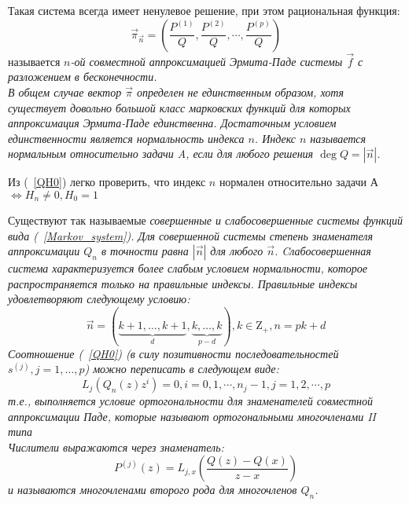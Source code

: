 Такая система всегда имеет ненулевое решение, при
этом рациональная функция:\\
\begin{equation}
\label{HermitePade} \overrightarrow{\pi}_{\overrightarrow{n}}=
\left( \frac {P^{(1)}} {Q}, \frac {P^{(2)}} {Q}, \cdots, \frac
{P^{(p)}} {Q} \right)
\end{equation}
называется \it $n$-ой совместной аппроксимацией Эрмита-Паде \rm
системы $\overrightarrow{f}$ с разложением в бесконечности. \\ В
общем случае вектор $\overrightarrow{\pi}$ определен не
единственным образом, хотя существует довольно большой класс
марковских функций для которых аппроксимация Эрмита-Паде
единственна. Достаточным условием единственности является \it
нормальность индекса \rm $n$. Индекс $n$ называется нормальным
относительно задачи A, если для любого решения $\deg Q=|\overrightarrow{n}|$. \\
\begin{coly} Из (~\ref{QH0}) легко проверить, что индекс $n$
нормален относительно задачи А $\Leftrightarrow H_n \not= 0, H_0
= 1$ \end{coly}
Существуют так называемые \it совершенные \rm и \it
слабосовершенные \rm системы функций вида (~\ref{Markov_system}).
Для совершенной системы степень знаменателя аппроксимации $Q_n$ в
точности равна $|\overrightarrow{n}|$ для любого
$\overrightarrow{n}$. Cлабосовершенная система характеризуется
более слабым условием нормальности, которое распространяется
только на правильные индексы. \it Правильные индексы \rm
удовлетворяют следующему условию:
$$
\overrightarrow{n}=(\underbrace{k+1,\ldots,k+1}_{d},\underbrace{k,\ldots,k}_{p-d}),
k\in{\mbox{Z}}_{+},n=pk+d
$$
Соотношение (~\ref{QH0}) (в силу позитивности последовательностей
${s^{(j)}}, j=1,\ldots,p$) можно переписать в следующем виде:
\begin{equation}
\label{QOrthogonality} L_j(Q_n(z)z^i) = 0, i =0,1,\cdots, n_j-1,
j=1,2,\cdots,p
\end{equation}
т.е., выполняется условие ортогональности для знаменателей
совместной аппроксимации Паде, которые называют \it ортогональными
многочленами II типа \rm \\ Числители выражаются через
знаменатель:
$$
P^{(j)}(z)=L_{j,x} \left( \displaystyle \frac {Q(z)-Q(x)}{z-x}
\right)
$$
и называются \it многочленами второго рода \rm для многочленов $Q_n$. \\
